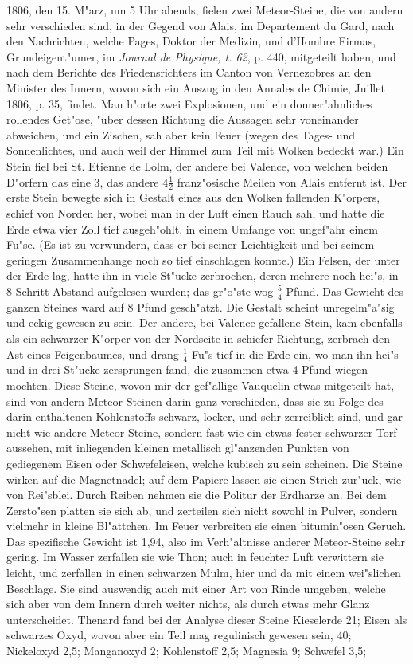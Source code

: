 \documentclass[a4paper, 11pt, oneside, polutonikogreek, german]{article}
\begin{document}
1806, den 15. M"arz, um 5 Uhr abends, fielen zwei Meteor-Steine, die von andern sehr verschieden sind, in der Gegend von Alais, im Departement du Gard, nach den Nachrichten, welche Pages, Doktor der Medizin, und d'Hombre Firmas, Grundeigent"umer, im \emph{Journal de Physique, t. 62}, p. 440, mitgeteilt haben, und nach dem Berichte des Friedensrichters im Canton von Vernezobres an den Minister des Innern, wovon sich ein Auszug in den Annales de Chimie, Juillet 1806, p. 35, findet. Man h"orte zwei Explosionen, und ein donner"ahnliches rollendes Get"ose, "uber dessen Richtung die Aussagen sehr voneinander abweichen, und ein Zischen, sah aber kein Feuer (wegen des Tages- und Sonnenlichtes, und auch weil der Himmel zum Teil mit Wolken bedeckt war.) Ein Stein fiel bei St. Etienne de Lolm, der andere bei Valence, von welchen beiden D"orfern das eine 3, das andere $\mathfrak{4\frac{1}{2}}$ franz"osische Meilen von Alais entfernt ist. Der erste Stein bewegte sich in Gestalt eines aus den Wolken fallenden K"orpers, schief von Norden her, wobei man in der Luft einen Rauch sah, und hatte die Erde etwa vier Zoll tief ausgeh"ohlt, in einem Umfange von ungef"ahr einem Fu"se. (Es ist zu verwundern, dass er bei seiner Leichtigkeit und bei seinem geringen Zusammenhange noch so tief einschlagen konnte.) Ein Felsen, der unter der Erde lag, hatte ihn in viele St"ucke zerbrochen, deren mehrere noch hei"s, in 8 Schritt Abstand aufgelesen wurden; das gr"o"ste wog $\mathfrak{\frac{5}{4}}$ Pfund. Das Gewicht des ganzen Steines ward auf 8 Pfund gesch"atzt. Die Gestalt scheint unregelm"a"sig und eckig gewesen zu sein. Der andere, bei Valence gefallene Stein, kam ebenfalls als ein schwarzer K"orper von der Nordseite in schiefer Richtung, zerbrach den Ast eines Feigenbaumes, und drang $\mathfrak{\frac{1}{4}}$ Fu"s tief in die Erde ein, wo man ihn hei"s und in drei St"ucke zersprungen fand, die zusammen etwa 4 Pfund wiegen mochten. Diese Steine, wovon mir der gef"allige Vauquelin etwas mitgeteilt hat, sind von andern Meteor-Steinen darin ganz verschieden, dass sie zu Folge des darin enthaltenen Kohlenstoffs schwarz, locker, und sehr zerreiblich sind, und gar nicht wie andere Meteor-Steine, sondern fast wie ein etwas fester schwarzer Torf aussehen, mit inliegenden kleinen metallisch gl"anzenden Punkten von gediegenem Eisen oder Schwefeleisen, welche kubisch zu sein scheinen. Die Steine wirken auf die Magnetnadel; auf dem Papiere lassen sie einen Strich zur"uck, wie von Rei"sblei. Durch Reiben nehmen sie die Politur der Erdharze an. Bei dem Zersto"sen platten sie sich ab, und zerteilen sich nicht sowohl in Pulver, sondern vielmehr in kleine Bl"attchen. Im Feuer verbreiten sie einen bitumin"osen Geruch. Das spezifische Gewicht ist 1,94, also im Verh"altnisse anderer Meteor-Steine sehr gering. Im Wasser zerfallen sie wie Thon; auch in feuchter Luft verwittern sie leicht, und zerfallen in einen schwarzen Mulm, hier und da mit einem wei"slichen Beschlage. Sie sind auswendig auch mit einer Art von Rinde umgeben, welche sich aber von dem Innern durch weiter nichts, als durch etwas mehr Glanz unterscheidet. Thenard fand bei der Analyse dieser Steine Kieselerde 21; Eisen als schwarzes Oxyd, wovon aber ein Teil mag regulinisch gewesen sein, 40; Nickeloxyd 2,5; Manganoxyd 2; Kohlenstoff 2,5; Magnesia 9; Schwefel 3,5; 
\end{document}
